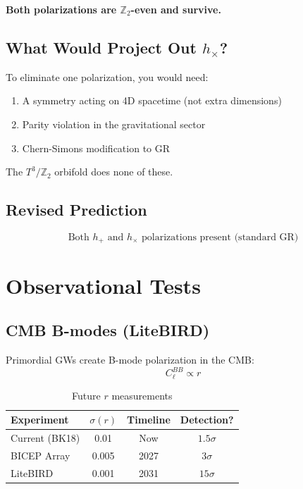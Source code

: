 \documentclass[12pt,a4paper]{article}
\begin{document}
\textbf{Both polarizations are $\mathbb{Z}_2$-even and survive.}

\subsection{What Would Project Out $h_\times$?}

To eliminate one polarization, you would need:
\begin{enumerate}
    \item A symmetry acting on 4D spacetime (not extra dimensions)
    \item Parity violation in the gravitational sector
    \item Chern-Simons modification to GR
\end{enumerate}

The $T^3/\mathbb{Z}_2$ orbifold does none of these.

\subsection{Revised Prediction}

\begin{equation}
\boxed{\text{Both } h_+ \text{ and } h_\times \text{ polarizations present (standard GR)}}
\end{equation}

\section{Observational Tests}

\subsection{CMB B-modes (LiteBIRD)}

Primordial GWs create B-mode polarization in the CMB:
\begin{equation}
C_\ell^{BB} \propto r
\end{equation}

\begin{table}[h]
\centering
\begin{tabular}{lccc}
\toprule
Experiment & $\sigma(r)$ & Timeline & Detection? \\
\midrule
Current (BK18) & 0.01 & Now & $1.5\sigma$ \\
BICEP Array & 0.005 & 2027 & $3\sigma$ \\
LiteBIRD & 0.001 & 2031 & $15\sigma$ \\
\bottomrule
\end{tabular}
\caption{Future $r$ measurements}
\end{table}
\end{document}
